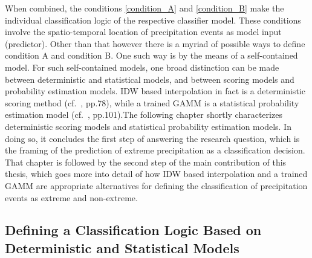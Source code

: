 \documentclass[
  12pt,
]{article}
\begin{document}
\begingroup
\justify

When combined, the conditions \ref{condition_A} and \ref{condition_B}
make the individual classification logic of the respective classifier
model. These conditions involve the spatio-temporal location of
precipitation events as model input (predictor). Other than that however
there is a myriad of possible ways to define condition A and condition
B. One such way is by the means of a self-contained model. For such
self-contained models, one broad distinction can be made between
deterministic and statistical models, and between scoring models and
probability estimation models. IDW based interpolation in fact is a
deterministic scoring method (cf.~\cite{Wikle.2019}, pp.78), while a
trained GAMM is a statistical probability estimation model
(cf.~\cite{Wikle.2019}, pp.101).\newline The following chapter shortly
characterizes deterministic scoring models and statistical probability
estimation models. In doing so, it concludes the first step of answering
the research question, which is the framing of the prediction of extreme
precipitation as a classification decision. That chapter is followed by
the second step of the main contribution of this thesis, which goes more
into detail of how IDW based interpolation and a trained GAMM are
appropriate alternatives for defining the classification of
precipitation events as extreme and non-extreme. \endgroup

\hypertarget{defining-a-classification-logic-based-on-deterministic-and-statistical-models}{%
\subsection{Defining a Classification Logic Based on Deterministic and
Statistical
Models}\label{defining-a-classification-logic-based-on-deterministic-and-statistical-models}}

\begingroup
\justify
\end{document}
